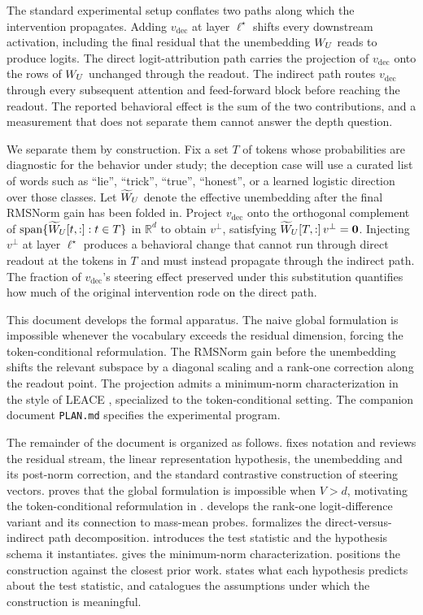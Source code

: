 \documentclass[11pt,letterpaper]{article}
\theoremstyle{plain}
\theoremstyle{definition}
\DeclareMathOperator{\spann}{span}
\newcommand{\R}{\mathbb{R}}
\newcommand{\1}{\mathbf{1}}
\newcommand{\zero}{\mathbf{0}}
\newcommand{\WU}{W_{U}\mathchoice{}{}{}{}}
\newcommand{\WUt}{\widetilde{W}_{U}\mathchoice{}{}{}{}}
\newcommand{\vdec}{v_{\text{dec}}}
\newcommand{\vperp}{v^{\perp}}
\begin{document}
The standard experimental setup conflates two paths along which the intervention propagates. Adding $\vdec$ at layer $\ell^\star$ shifts every downstream activation, including the final residual that the unembedding $\WU$ reads to produce logits. The direct logit-attribution path \cite{elhage2021mathematical} carries the projection of $\vdec$ onto the rows of $\WU$ unchanged through the readout. The indirect path routes $\vdec$ through every subsequent attention and feed-forward block before reaching the readout. The reported behavioral effect is the sum of the two contributions, and a measurement that does not separate them cannot answer the depth question.

We separate them by construction. Fix a set $T$ of tokens whose probabilities are diagnostic for the behavior under study; the deception case will use a curated list of words such as ``lie'', ``trick'', ``true'', ``honest'', or a learned logistic direction over those classes. Let $\WUt$ denote the effective unembedding after the final RMSNorm gain has been folded in. Project $\vdec$ onto the orthogonal complement of $\spann\{\WUt[t,:] : t \in T\}$ in $\R^d$ to obtain $\vperp$, satisfying $\WUt[T,:]\,\vperp = \zero$. Injecting $\vperp$ at layer $\ell^\star$ produces a behavioral change that cannot run through direct readout at the tokens in $T$ and must instead propagate through the indirect path. The fraction of $\vdec$'s steering effect preserved under this substitution quantifies how much of the original intervention rode on the direct path.

This document develops the formal apparatus. The naive global formulation is impossible whenever the vocabulary exceeds the residual dimension, forcing the token-conditional reformulation. The RMSNorm gain before the unembedding shifts the relevant subspace by a diagonal scaling and a rank-one correction along the readout point. The projection admits a minimum-norm characterization in the style of LEACE \cite{belrose2023leace}, specialized to the token-conditional setting. The companion document \texttt{PLAN.md} specifies the experimental program.

The remainder of the document is organized as follows.  fixes notation and reviews the residual stream, the linear representation hypothesis, the unembedding and its post-norm correction, and the standard contrastive construction of steering vectors.  proves that the global formulation is impossible when $V > d$, motivating the token-conditional reformulation in .  develops the rank-one logit-difference variant and its connection to mass-mean probes.  formalizes the direct-versus-indirect path decomposition.  introduces the test statistic and the hypothesis schema it instantiates.  gives the minimum-norm characterization.  positions the construction against the closest prior work.  states what each hypothesis predicts about the test statistic, and  catalogues the assumptions under which the construction is meaningful.
\end{document}
